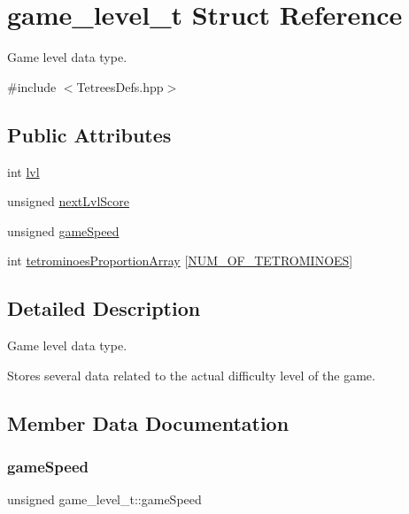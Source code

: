 \hypertarget{structgame__level__t}{}\section{game\+\_\+level\+\_\+t Struct Reference}
\label{structgame__level__t}


Game level data type.  




{\ttfamily \#include $<$Tetrees\+Defs.\+hpp$>$}

\subsection*{Public Attributes}
\begin{DoxyCompactItemize}
\item 
int \hyperlink{structgame__level__t_ab80383a9c51e3ad25cda4df0a7df8df2}{lvl}
\item 
unsigned \hyperlink{structgame__level__t_a9f5f86c9c90bebdd20950d74bf2dd450}{next\+Lvl\+Score}
\item 
unsigned \hyperlink{structgame__level__t_a2501f9b624ec9cf7788649127e111a33}{game\+Speed}
\item 
int \hyperlink{structgame__level__t_abcef20ad8f4df7d270a4d5111ac8d85a}{tetrominoes\+Proportion\+Array} \mbox{[}\hyperlink{TetreesDefs_8hpp_a69fa4aa1afe74f7f9ec42bf1e07ddf28}{N\+U\+M\+\_\+\+O\+F\+\_\+\+T\+E\+T\+R\+O\+M\+I\+N\+O\+ES}\mbox{]}
\end{DoxyCompactItemize}


\subsection{Detailed Description}
Game level data type. 

Stores several data related to the actual difficulty level of the game. 

\subsection{Member Data Documentation}
\mbox{\label{structgame__level__t_a2501f9b624ec9cf7788649127e111a33}} 
\subsubsection{\texorpdfstring{game\+Speed}{gameSpeed}}
{\footnotesize\ttfamily unsigned game\+\_\+level\+\_\+t\+::game\+Speed}

